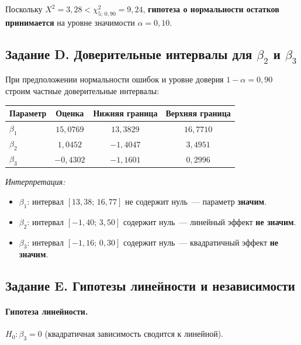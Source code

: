 \documentclass[12pt,a4paper]{article}
\begin{document}
Поскольку $X^2 = 3{,}28 < \chi^2_{5;\, 0{,}90} = 9{,}24$, \textbf{гипотеза о нормальности остатков принимается} на уровне значимости $\alpha = 0{,}10$.

\subsection{Задание D. Доверительные интервалы для $\beta_2$ и $\beta_3$}

При предположении нормальности ошибок и уровне доверия $1 - \alpha = 0{,}90$ строим частные доверительные интервалы:

\begin{center}
\begin{tabular}{lccc}
\toprule
Параметр & Оценка & Нижняя граница & Верхняя граница \\
\midrule
$\beta_1$ & $15{,}0769$ & $13{,}3829$ & $16{,}7710$ \\
$\beta_2$ & $1{,}0452$  & $-1{,}4047$ & $3{,}4951$  \\
$\beta_3$ & $-0{,}4302$ & $-1{,}1601$ & $0{,}2996$  \\
\bottomrule
\end{tabular}
\end{center}

\textit{Интерпретация:}
\begin{itemize}
  \item $\beta_1$: интервал $[13{,}38;\, 16{,}77]$ не содержит нуль~--- параметр \textbf{значим}.
  \item $\beta_2$: интервал $[-1{,}40;\, 3{,}50]$ содержит нуль~--- линейный эффект \textbf{не значим}.
  \item $\beta_3$: интервал $[-1{,}16;\, 0{,}30]$ содержит нуль~--- квадратичный эффект \textbf{не значим}.
\end{itemize}

\subsection{Задание E. Гипотезы линейности и независимости}

\paragraph{Гипотеза линейности.} $H_0: \beta_3 = 0$ (квадратичная зависимость сводится к линейной).
\end{document}
